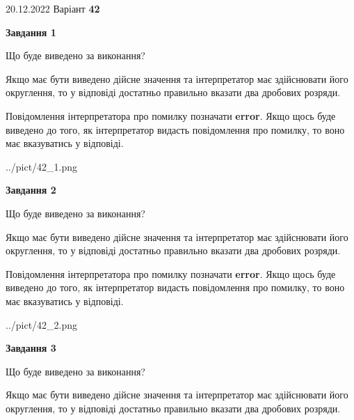 \documentclass[12pt, ukrainian]{article}
\begin{document}
{20.12.2022 Варіант \No \textbf { 42 }\par}
{
\begin {Large}

{\begin {center}\textbf{Завдання 1}\end {center}}\par
Що буде виведено за виконання? \par

Якщо має бути виведено дійсне значення та інтерпретатор має здійснювати його округлення, 
то у відповіді достатньо правильно вказати два дробових розряди.

Повідомлення інтерпретатора про помилку позначати \textbf{error}.
Якщо щось буде виведено до того, як інтерпретатор видасть повідомлення про помилку, 
то воно має вказуватись у відповіді. \par

\begin{center}
	{../pict/42_1.png}
\end{center}
\newpage

{\begin {center}\textbf{Завдання 2}\end {center}}\par
Що буде виведено за виконання? \par

Якщо має бути виведено дійсне значення та інтерпретатор має здійснювати його округлення, 
то у відповіді достатньо правильно вказати два дробових розряди.

Повідомлення інтерпретатора про помилку позначати \textbf{error}.
Якщо щось буде виведено до того, як інтерпретатор видасть повідомлення про помилку, 
то воно має вказуватись у відповіді. \par

\begin{center}
	{../pict/42_2.png}
\end{center}
\newpage

{\begin {center}\textbf{Завдання 3}\end {center}}\par
Що буде виведено за виконання? \par

Якщо має бути виведено дійсне значення та інтерпретатор має здійснювати його округлення, 
то у відповіді достатньо правильно вказати два дробових розряди.


\end{Large}}
\end{document}
